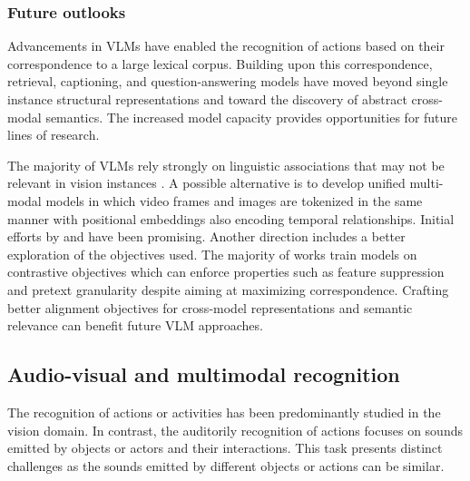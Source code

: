 

\subsubsection{Future outlooks}

Advancements in VLMs have enabled the recognition of actions based on their correspondence to a large lexical corpus. Building upon this correspondence, retrieval, captioning, and question-answering models have moved beyond single instance structural representations and toward the discovery of abstract cross-modal semantics. The increased model capacity provides opportunities for future lines of research.

The majority of VLMs rely strongly on linguistic associations that may not be relevant in vision instances \citep{rahmanzadehgervi2024vision}. A possible alternative is to develop unified multi-modal models in which video frames and images are tokenized in the same manner with positional embeddings also encoding temporal relationships. Initial efforts by \citet{jang2023unifying} and \citet{jin2024integration} have been promising. Another direction includes a better exploration of the objectives used. The majority of works train models on contrastive objectives \citep{chen2020simple,he2020momentum,oord2018representation} which can enforce properties such as feature suppression \citep{chen2021intriguing} and pretext granularity \citep{cole2022does} despite aiming at maximizing correspondence. Crafting better alignment objectives for cross-model representations and semantic relevance can benefit future VLM approaches.  




\subsection{Audio-visual and multimodal recognition} 
\label{sec:recognition::audio}

The recognition of actions or activities has been predominantly studied in the vision domain. In contrast, the auditorily recognition of actions focuses on sounds emitted by objects or actors and their interactions. This task presents distinct challenges as the sounds emitted by different objects or actions can be similar. 


